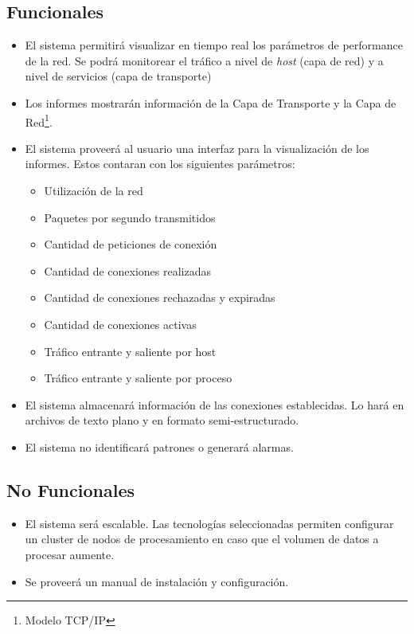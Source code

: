 \subsection*{Funcionales}
\begin{itemize}
	\item El sistema permitirá visualizar en tiempo real los parámetros de performance de la red. Se podrá monitorear el tráfico a nivel de \textit{host} (capa de red) y a nivel de servicios (capa de transporte)
	\item Los informes mostrarán información de la Capa de Transporte y la Capa de Red\footnote{Modelo TCP/IP}. \cite{rfc791}\cite{rfc793}\cite{rfc1180}
	\item El sistema proveerá al usuario una interfaz para la visualización de los informes. Estos contaran con los siguientes parámetros:
	\begin{itemize}
		\item Utilización de la red
		\item Paquetes por segundo transmitidos
		\item Cantidad de peticiones de conexión
		\item Cantidad de conexiones realizadas
		\item Cantidad de conexiones rechazadas y expiradas
		\item Cantidad de conexiones activas
		\item Tráfico entrante y saliente por host
		\item Tráfico entrante y saliente por proceso
	\end{itemize}
	\item El sistema almacenará información de las conexiones establecidas. Lo hará en archivos de texto plano y en formato semi-estructurado.
	\item El sistema no identificará patrones o generará alarmas.
\end{itemize}

\subsection*{No Funcionales}
\begin{itemize}
	\item El sistema será escalable. Las tecnologías seleccionadas permiten configurar un cluster de nodos de procesamiento en caso que el volumen de datos a procesar aumente.
	\item Se proveerá un manual de instalación y configuración.
\end{itemize}
 
